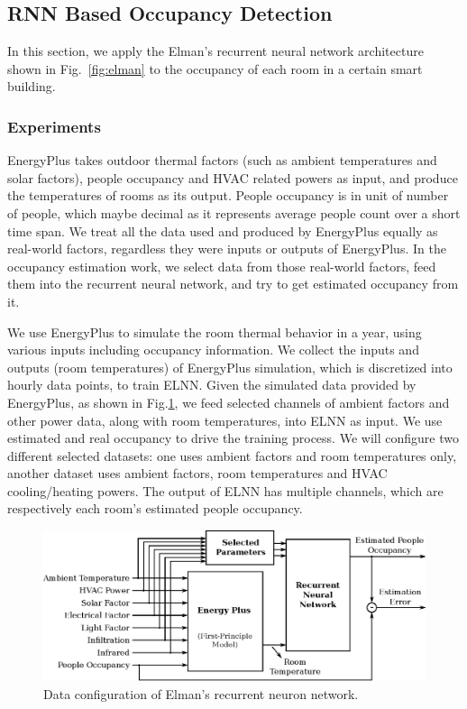 \subsection{RNN Based Occupancy Detection}
\label{sec:rnn-method}

In this section, we apply the Elman's recurrent neural network architecture shown in
Fig.~\ref{fig:elman} to the occupancy of each room in a certain smart building.

\subsubsection{Experiments}
EnergyPlus takes outdoor thermal factors (such as ambient temperatures and solar
factors), people occupancy and HVAC related powers as input, and produce the
temperatures of rooms as its output. People occupancy is in unit of number of
people, which maybe decimal as it represents average people count over a short
time span. We treat all the data used and produced by EnergyPlus equally as
real-world factors, regardless they were inputs or outputs of EnergyPlus. In the
occupancy estimation work, we select data from those real-world factors, feed
them into the recurrent neural network, and try to get estimated occupancy from
it.

We use EnergyPlus to simulate the room thermal behavior in a year, using various
inputs including occupancy information. We collect the inputs and outputs (room
temperatures) of EnergyPlus simulation, which is discretized into hourly data
points, to train ELNN. Given the simulated data
provided by EnergyPlus, as shown in Fig.\ref{fig:data-flow}, we feed selected
channels of ambient factors and other power data, along with room temperatures,
into ELNN as input. We use estimated and real
occupancy to drive the training process. We will configure two different
selected datasets: one uses ambient factors and room temperatures only, another
dataset uses ambient factors, room temperatures and HVAC cooling/heating
powers. The output of ELNN has multiple channels, which are
respectively each room's estimated people occupancy.

\begin{figure}[t]
    \centering
    \includegraphics[width=0.9\columnwidth]{figs/rnn/data-flow.eps}
    \caption{Data configuration of Elman's recurrent neuron network.}
    \label{fig:data-flow}
\end{figure}

